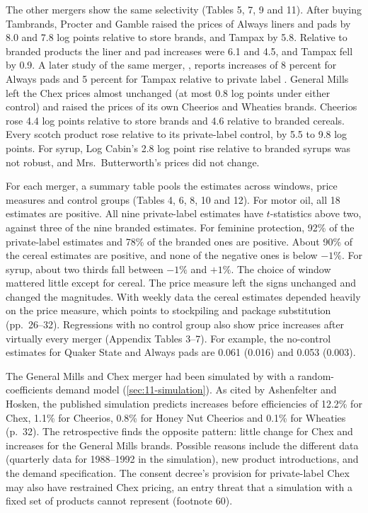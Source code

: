 The other mergers show the same selectivity (Tables 5, 7, 9 and 11). After buying Tambrands, Procter and Gamble
raised the prices of Always liners and pads by 8.0 and 7.8 log points relative to store brands, and Tampax by
5.8.
Relative to branded products the liner and pad increases were 6.1 and 4.5, and Tampax fell by 0.9. A later study
of the same merger, \citet{Weinberg2011}, reports increases of 8 percent for Always pads and 5 percent for Tampax
relative to private label \citep[p.~262]{AskerNocke2021}. General
Mills left the Chex prices almost unchanged (at most 0.8 log points under either control) and raised the prices
of its own Cheerios and Wheaties brands. Cheerios rose 4.4 log points relative to store brands and 4.6 relative
to branded cereals. Every scotch product rose relative to its private-label control, by 5.5 to 9.8 log points.
For syrup, Log Cabin's 2.8 log point rise relative to branded syrups was not robust, and Mrs.\ Butterworth's prices
did not change.

 For each merger, a summary table pools the estimates across windows, price measures and
control groups (Tables 4, 6, 8, 10 and 12). For motor oil, all 18 estimates are positive. All nine private-label
estimates have $t$-statistics above two, against three of the nine branded estimates. For feminine protection,
92\% of the private-label estimates and 78\% of the branded ones are positive. About 90\% of the cereal estimates
are positive, and none of the negative ones is below $-1\%$. For syrup, about two thirds fall between $-1\%$ and
$+1\%$. The choice of window mattered little except for cereal. The price measure left the signs unchanged and
changed the magnitudes. With weekly data the cereal estimates depended heavily on the price measure, which points to
stockpiling and package substitution (pp.~26--32). Regressions with no control group also show price increases
after virtually every merger (Appendix Tables 3--7). For example, the no-control estimates for Quaker State and
Always pads are 0.061 (0.016) and 0.053 (0.003).

 The General Mills and Chex merger had been simulated by
\citet{Nevo2000b} with a random-coefficients demand model (\cref{sec:11-simulation}). As cited by Ashenfelter and
Hosken, the published simulation predicts increases before efficiencies of 12.2\% for Chex, 1.1\% for Cheerios,
0.8\% for Honey Nut Cheerios and 0.1\% for Wheaties (p.~32). The retrospective finds the opposite pattern: little
change for Chex and increases for the General Mills brands. Possible reasons include the different data
(quarterly data for 1988--1992 in the simulation), new product introductions, and the demand specification. The
consent decree's provision for private-label Chex may also have restrained Chex pricing, an entry threat that a
simulation with a fixed set of products cannot represent (footnote 60).

